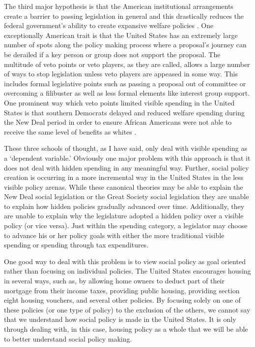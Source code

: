 \documentclass[12pt]{article}
\begin{document}
The third major hypothesis is that the American institutional arrangements create a barrier to passing legislation in general and this drastically reduces the federal government's ability to create expansive welfare policies \citep{pierson1995, robertson2011}. One exceptionally American trait is that the United States has an extremely large number of spots along the policy making process where a proposal's journey can be derailed if a key person or group does not support the proposal. The multitude of veto points or veto players, as they are called, allows a large number of ways to stop legislation unless veto players are appeased in some way. This includes formal legislative points such as passing a proposal out of committee or overcoming a filibuster as well as less formal elements like interest group support. One prominent way which veto points limited visible spending in the United States is that southern Democrats delayed and reduced welfare spending during the New Deal period in order to ensure African Americans were not able to receive the same level of benefits as whites \citep{katznelson2013}. 

These three schools of thought, as I have said, only deal with visible spending as a `dependent variable.' Obviously one major problem with this approach is that it does not deal with hidden spending in any meaningful way. Further, social policy creation is occurring in a more incremental way in the United States in the less visible policy arenas. While these canonical theories may be able to explain the New Deal social legislation or the Great Society social legislation they are unable to explain how hidden policies gradually advanced over time. Additionally, they are unable to explain why the legislature adopted a hidden policy over a visible policy (or vice versa). Just within the spending category, a legislator may choose to advance his or her policy goals with either the more traditional visible spending or spending through tax expenditures.

One good way to deal with this problem is to view social policy as goal oriented rather than focusing on individual policies. The United States encourages housing in several ways, such as, by allowing home owners to deduct part of their mortgage from their income taxes, providing public housing, providing section eight housing vouchers, and several other policies. By focusing solely on one of these policies (or one type of policy) to the exclusion of the others, we cannot say that we understand how social policy is made in the United States. It is only through dealing with, in this case, housing policy as a whole that we will be able to better understand social policy making.
\end{document}
